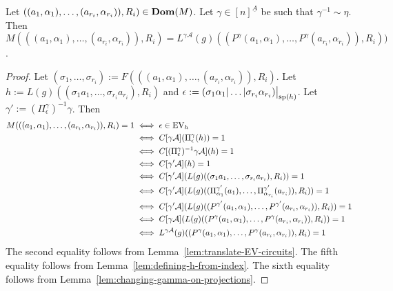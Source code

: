 \documentclass[../main/thesis.tex]{subfiles}
\begin{document}
\begin{prop}
  Let $((a_1, \alpha_1), \ldots, (a_{r_i}, \alpha_{r_i})), R_i) \in \text{\textbf{Dom}} (M)$.
  Let $\gamma \in [n]^{\underline{A}}$ be such that $ \gamma^{-1} \sim \eta$.
  Then $M(((a_1, \alpha_1), \ldots, (a_{r_i}, \alpha_{r_i})), R_i) =
  L^{\gamma\mathcal{A}}(g)((P^{\gamma}(a_1, \alpha_1), \ldots,
  P^{\gamma}(a_{r_i}, \alpha_{r_i})), R_i))$.
  
	\label{prop:M-to-L-homomorphism}
\end{prop}
\begin{proof}
  Let $(\sigma_1, \ldots, \sigma_{r_i}) := F(((a_1, \alpha_1), \ldots, (a_{r_i},
  \alpha_{r_i})), R_i)$. Let $h := L(g)((\sigma_1 a_1, \ldots, \sigma_{r_i}
  a_{r_i}), R_i)$ and $\epsilon := \restr{(\sigma_1 \alpha_1 \vert \ldots \vert
    \sigma_{r_i} \alpha_{r_i})}{\consp(h)}$. Let $\gamma' :=
  (\Pi^{\gamma}_{\epsilon})^{-1} \gamma$. Then
	\begin{align*}
    M(((a_1, \alpha_1), \ldots, (a_{r_i}, \alpha_{r_i})), R_i) = 1 &\iff \epsilon \in \text{EV}_h \\
                                                                   &\iff C[\gamma \mathcal{A}] (\Pi^{\gamma}_{\epsilon} (h))  = 1\\
                                                                   &\iff C[(\Pi^{\gamma}_{\epsilon})^{-1}\gamma \mathcal{A}] (h)  = 1\\
                                                                   &\iff C[\gamma' \mathcal{A}] (h)  = 1  \\
                                                                   &\iff C[\gamma' \mathcal{A}](L(g)((\sigma_1 a_1, \ldots, \sigma_{r_i}
                                                                     a_{r_i}), R_i)) = 1                                       \\
                                                                   &\iff C[\gamma' \mathcal{A}](L(g)((\Pi^{\gamma'}_{\alpha_1}(a_1), \ldots, \Pi^{\gamma'}_{\alpha_{r_i}}(a_{r_i})), R_i)) = 1  \\
                                                                   &\iff C[\gamma' \mathcal{A}](L(g)((P^{\gamma'}(a_1, \alpha_1), \ldots, P^{\gamma'}(a_{r_i}, \alpha_{r_i})), R_i)) = 1  \\
                                                                   &\iff C[\gamma \mathcal{A}](L(g)((P^{\gamma}(a_1, \alpha_1), \ldots, P^{\gamma}(a_{r_i}, \alpha_{r_i})), R_i)) = 1  \\
                                                                   &\iff L^{\gamma \mathcal{A}}(g)((P^{\gamma}(a_1, \alpha_1), \ldots, P^{\gamma}(a_{r_i}, \alpha_{r_i})), R_i) = 1
	\end{align*}
	The second equality follows from Lemma~\ref{lem:translate-EV-circuits}. The
  fifth equality follows from Lemma~\ref{lem:defining-h-from-index}. The sixth
  equality follows from Lemma~\ref{lem:changing-gamma-on-projections}.
\end{proof}
\end{document}
